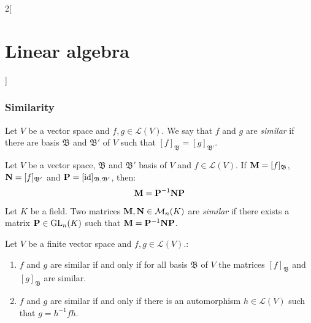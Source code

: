 \documentclass[../../../main.tex]{subfiles}
\begin{document}
\begin{multicols}{2}[\section{Linear algebra}]
  \subsubsection*{Similarity}
  \begin{definition}
    Let $V$ be a vector space and $f,g\in\mathcal{L}(V)$. We say that $f$ and $g$ are \textit{similar} if there are basis $\mathfrak{B}$ and $\mathfrak{B}'$ of $V$ such that $[f]_\mathfrak{B}=[g]_{\mathfrak{B}'}$.
  \end{definition}
  \begin{lemma}
    Let $V$ be a vector space, $\mathfrak{B}$ and $\mathfrak{B}'$ basis of $V$ and $f\in\mathcal{L}(V)$. If $\vb{M}=[f]_\mathfrak{B}$, $\vb{N}=[f]_{\mathfrak{B}'}$ and $\vb{P}=[\mathrm{id}]_{\mathfrak{B},\mathfrak{B}'}$, then: $$\vb{M}=\vb{P}^{-1}\vb{N}\vb{P}$$
  \end{lemma}
  \begin{definition}
    Let $K$ be a field. Two matrices $\vb{M},\vb{N}\in\mathcal{M}_n(K)$ are \textit{similar} if there exists a matrix $\vb{P}\in\mathrm{GL}_n(K)$ such that $\vb{M}=\vb{P}^{-1}\vb{N}\vb{P}$.
  \end{definition}
  \begin{prop}
    Let $V$ be a finite vector space and $f,g\in\mathcal{L}(V)$.:
    \begin{enumerate}
      \item $f$ and $g$ are similar if and only if for all basis $\mathfrak{B}$ of $V$ the matrices $[f]_\mathfrak{B}$ and $[g]_\mathfrak{B}$ are similar.
      \item $f$ and $g$ are similar if and only if there is an automorphism $h\in\mathcal{L}(V)$ such that $g=h^{-1}fh$.
    \end{enumerate}
  \end{prop}

\end{multicols}
\end{document}
